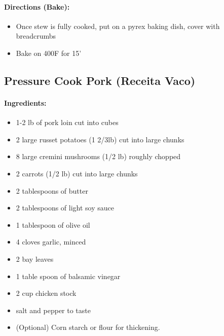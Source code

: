\documentclass{article}
\begin{document}
\paragraph{Directions (Bake):}
\begin{itemize}
	\item Once stew is fully cooked, put on a pyrex baking dish, cover with breadcrumbs
	\item Bake on 400F for 15'
\end{itemize}

\subsection{Pressure Cook Pork (Receita Vaco)}

\paragraph{Ingredients:}
\begin{itemize}
	\item	1-2 lb of pork loin cut into cubes
	\item 2 large russet potatoes (1 2/3lb) cut into large chunks
	\item 8 large cremini mushrooms (1/2 lb) roughly chopped
	\item 2 carrots (1/2 lb) cut into large chunks
	\item 2 tablespoons of butter
	\item 2 tablespoons of light soy sauce
	\item 1 tablespoon of olive oil
	\item 4 cloves garlic, minced
	\item 2 bay leaves
	\item 1 table spoon of balsamic vinegar
	\item 2 cup chicken stock
	\item salt and pepper to taste
	\item (Optional) Corn starch or flour for thickening.
\end{itemize}
\end{document}
